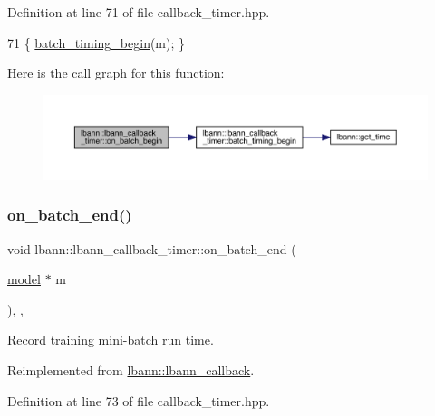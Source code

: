 Definition at line 71 of file callback\+\_\+timer.\+hpp.


\begin{DoxyCode}
71 \{ \hyperlink{classlbann_1_1lbann__callback__timer_a6a8a59707a52b8b570b7605b90fdd159}{batch\_timing\_begin}(m); \}
\end{DoxyCode}
Here is the call graph for this function\+:\nopagebreak
\begin{figure}[H]
\begin{center}
\leavevmode
\includegraphics[width=350pt]{classlbann_1_1lbann__callback__timer_aa6b016b9fb470a7614ab4147ae105002_cgraph}
\end{center}
\end{figure}
\mbox{\label{classlbann_1_1lbann__callback__timer_aff885381753dfc63709531aebc827b0e}} 
\subsubsection{\texorpdfstring{on\+\_\+batch\+\_\+end()}{on\_batch\_end()}}
{\footnotesize\ttfamily void lbann\+::lbann\+\_\+callback\+\_\+timer\+::on\+\_\+batch\+\_\+end (\begin{DoxyParamCaption}\item[{\hyperlink{classlbann_1_1model}{model} $\ast$}]{m }\end{DoxyParamCaption})\hspace{0.3cm}{\ttfamily [inline]}, {\ttfamily [override]}, {\ttfamily [virtual]}}

Record training mini-\/batch run time. 

Reimplemented from \hyperlink{classlbann_1_1lbann__callback_a895ca577e358601fcae5c04749f60535}{lbann\+::lbann\+\_\+callback}.



Definition at line 73 of file callback\+\_\+timer.\+hpp.


